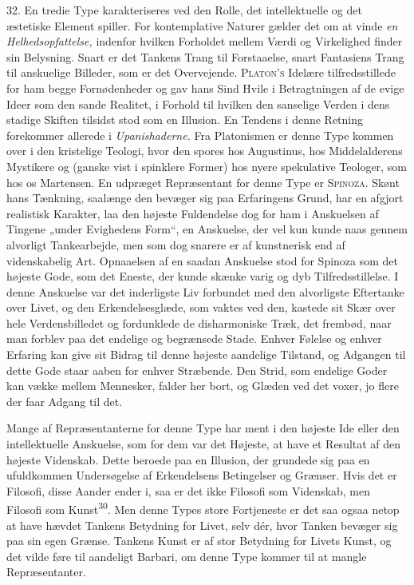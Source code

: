 \documentclass[12pt,a4paper,openany]{book}
\newcommand{\opage}[1]{\marginnote{\footnotesize\textit{[#1]}}}
\begin{document}
32. En tredie Type karakteriseres ved den Rolle, det intellektuelle og
det æstetiske Element spiller. For kontemplative Naturer gælder det om
at vinde \textit{en Helhedsopfattelse,} indenfor hvilken Forholdet
mellem Værdi og Virkelighed finder sin Belysning. Snart er det Tankens
Trang til Forstaaelse, snart Fantasiens Trang til anskuelige Billeder,
som er det Overvejende. \textsc{Platon’s} Idelære tilfredsstillede for
ham begge Fornødenheder og gav hans Sind Hvile i Betragtningen af de
evige Ideer som den sande Realitet, i Forhold til hvilken den sanselige
Verden i dens stadige Skiften tilsidst stod som en Illusion. En Tendens
i denne Retning forekommer allerede i \textit{Upanishaderne.} Fra
Platonismen er denne Type kommen over i den kristelige Teologi, hvor den
spores hos Augustinus, hos Middelalderens Mystikere og (ganske vist i
spinklere Former) hos nyere spekulative Teologer, som hos os Martensen.
En udpræget Repræsentant for denne Type er \textsc{Spinoza}. Skønt hans
Tænkning, saalænge den bevæger sig paa Erfaringens Grund, har en afgjort
realistisk Karakter, laa den højeste Fuldendelse dog for ham i
Anskuelsen af Tingene „under Evighedens Form“, en Anskuelse, der vel kun
\opage{76}kunde naas gennem alvorligt Tankearbejde, men som dog snarere
er af kunstnerisk end af videnskabelig Art. Opnaaelsen af en saadan
Anskuelse stod for Spinoza som det højeste Gode, som det Eneste, der
kunde skænke varig og dyb Tilfredsstillelse. I denne Anskuelse var det
inderligste Liv forbundet med den alvorligste Eftertanke over Livet, og
den Erkendelsesglæde, som vaktes ved den, kastede sit Skær over hele
Verdensbilledet og fordunklede de disharmoniske Træk, det frembød, naar
man forblev paa det endelige og begrænsede Stade. Enhver Følelse og
enhver Erfaring kan give sit Bidrag til denne højeste aandelige
Tilstand, og Adgangen til dette Gode staar aaben for enhver Stræbende.
Den Strid, som endelige Goder kan vække mellem Mennesker, falder her
bort, og Glæden ved det voxer, jo flere der faar Adgang til det.

Mange af Repræsentanterne for denne Type har ment i den højeste Ide
eller den intellektuelle Anskuelse, som for dem var det Højeste, at have
et Resultat af den højeste Videnskab. Dette beroede paa en Illusion, der
grundede sig paa en ufuldkommen Undersøgelse af Erkendelsens Betingelser
og Grænser. Hvis det er Filosofi, disse Aander ender i, saa er det ikke
Filosofi som Videnskab, men Filosofi som Kunst\textsuperscript{30}. Men
denne Types store Fortjeneste er det saa ogsaa netop at have hævdet
Tankens Betydning for Livet, selv dér, hvor Tanken bevæger sig paa sin
egen Grænse. Tankens Kunst er af stor Betydning for Livets Kunst, og det
vilde føre til aandeligt Barbari, om denne Type kommer til at mangle
Repræsentanter.
\end{document}
